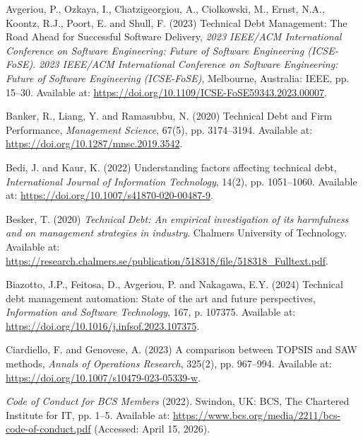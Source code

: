 \documentclass[
  12pt,
  letterpaper,
  12pt,
  oneside,
  english,
  onehalfspacing,
  headsepline]{MastersDoctoralThesis}
\newlength{\cslhangindent}
\newenvironment{CSLReferences}[2] %
 {\begin{list}{}{%
  \setlength{\itemindent}{0pt}
  \setlength{\leftmargin}{0pt}
  \setlength{\parsep}{0pt}
  \ifodd #1
   \setlength{\leftmargin}{\cslhangindent}
   \setlength{\itemindent}{-1\cslhangindent}
  \fi
  \setlength{\itemsep}{#2\baselineskip}}}
 {\end{list}}
\begin{document}
\begin{CSLReferences}{0}{1}
Avgeriou, P., Ozkaya, I., Chatzigeorgiou, A., Ciolkowski, M., Ernst,
N.A., Koontz, R.J., Poort, E. and Shull, F. (2023)
\textquotesingle Technical {Debt Management}: {The Road Ahead} for
{Successful Software Delivery}\textquotesingle, \emph{2023 {IEEE}/{ACM
International Conference} on {Software Engineering}: {Future} of
{Software Engineering} ({ICSE-FoSE})}. \emph{2023 {IEEE}/{ACM
International Conference} on {Software Engineering}: {Future} of
{Software Engineering} ({ICSE-FoSE})}, Melbourne, Australia: IEEE, pp.
15--30. Available at:
\url{https://doi.org/10.1109/ICSE-FoSE59343.2023.00007}.

Banker, R., Liang, Y. and Ramasubbu, N. (2020)
\textquotesingle Technical {Debt} and {Firm
Performance}\textquotesingle, \emph{Management Science}, 67(5), pp.
3174--3194. Available at: \url{https://doi.org/10.1287/mnsc.2019.3542}.

Bedi, J. and Kaur, K. (2022) \textquotesingle Understanding factors
affecting technical debt\textquotesingle, \emph{International Journal of
Information Technology}, 14(2), pp. 1051--1060. Available at:
\url{https://doi.org/10.1007/s41870-020-00487-9}.

Besker, T. (2020) \emph{Technical {Debt}: {An} empirical investigation
of its harmfulness and on management strategies in industry}. Chalmers
University of Technology. Available at:
\url{https://research.chalmers.se/publication/518318/file/518318_Fulltext.pdf}.

Biazotto, J.P., Feitosa, D., Avgeriou, P. and Nakagawa, E.Y. (2024)
\textquotesingle Technical debt management automation: {State} of the
art and future perspectives\textquotesingle, \emph{Information and
Software Technology}, 167, p. 107375. Available at:
\url{https://doi.org/10.1016/j.infsof.2023.107375}.

Ciardiello, F. and Genovese, A. (2023) \textquotesingle A comparison
between {TOPSIS} and {SAW} methods\textquotesingle, \emph{Annals of
Operations Research}, 325(2), pp. 967--994. Available at:
\url{https://doi.org/10.1007/s10479-023-05339-w}.

\emph{Code of {Conduct} for {BCS Members}} (2022). Swindon, UK: BCS, The
Chartered Institute for IT, pp. 1--5. Available at:
\url{https://www.bcs.org/media/2211/bcs-code-of-conduct.pdf} (Accessed:
April 15, 2026).


\end{CSLReferences}
\end{document}
